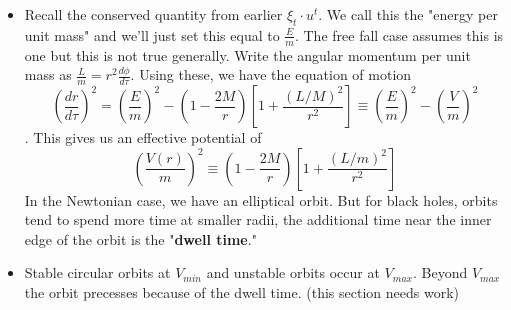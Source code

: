 \documentclass[11pt]{article}
\begin{document}
\begin{itemize}
    \item Recall the conserved quantity from earlier $\xi_t \cdot u^t$. We call this the "energy per unit mass" and we'll just set this equal to $\frac{E}{m}$. The free fall case assumes this is one but this is not true generally.
    Write the angular momentum per unit mass as $\frac{L}{m} = r^2 \frac{d\phi}{d\tau}$. Using these, we have the equation of motion 
    \[ 
        \left(\frac{dr}{d\tau}\right)^2 = \left(\frac{E}{m}\right)^2 - \left(1 - \frac{2M}{r}\right)\left[1 + \frac{(L/M)^2}{r^2}\right] \equiv \left(\frac{E}{m}\right)^2 - \left(\frac{V}{m}\right)^2 
    \].
     This gives us an effective potential of 
    \[
        \left(\frac{V(r)}{m}\right)^2 \equiv \left(1 - \frac{2M}{r}\right)\left[1 + \frac{(L/m)^2}{r^2}\right]
    \]
    In the Newtonian case, we have an elliptical orbit. But for black holes, orbits tend to spend more time at smaller radii, the additional time near the inner edge of the orbit is the "\textbf{dwell time}."
    
    \item Stable circular orbits at $V_{min}$ and unstable orbits occur at $V_{max}$. Beyond $V_{max}$ the orbit precesses because of the dwell time. (this section needs work)
\end{itemize}
\end{document}
